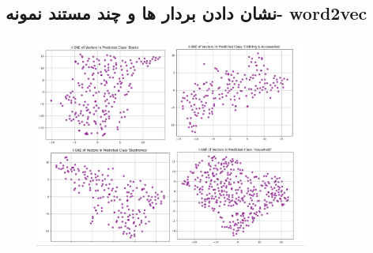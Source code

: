 \documentclass[a4paper,12pt]{article}
\begin{document}
\subsection{نشان دادن بردار ها و چند مستند نمونه- word2vec}
\begin{figure}[H]
    \centering
    \includegraphics[width=0.8\textwidth]{vectorsWord2vec.png}
    \label{fig:yourlabel}
\end{figure}
\end{document}
